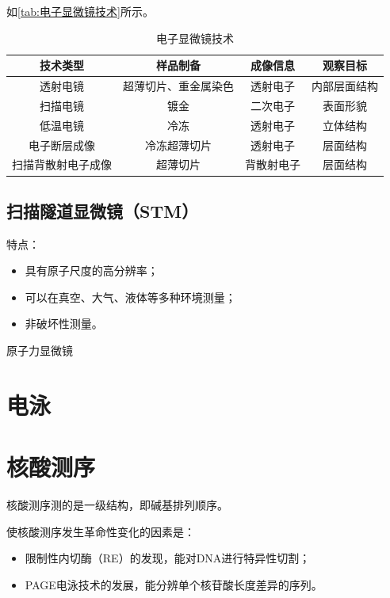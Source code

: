 如\autoref{tab:电子显微镜技术}所示。

\begin{table}[htbp]
	\centering
	\begin{tabularx}{\textwidth}{|c|c|C|C|}
		\hline
		\textbf{技术类型} & \textbf{样品制备} & \textbf{成像信息} & \textbf{观察目标} \\ \hline
		透射电镜 & 超薄切片、重金属染色 & 透射电子 & 内部层面结构 \\ \hline
		扫描电镜 & 镀金 & 二次电子 & 表面形貌 \\ \hline
		低温电镜 & 冷冻 & 透射电子 & 立体结构 \\ \hline
		电子断层成像 & 冷冻超薄切片 & 透射电子 & 层面结构 \\ \hline
		扫描背散射电子成像 & 超薄切片 & 背散射电子 & 层面结构 \\ \hline
	\end{tabularx}
	\caption{电子显微镜技术}
	\label{tab:电子显微镜技术}
\end{table}

\subsection{扫描隧道显微镜（STM）}

特点：
\begin{itemize}
	\item 具有原子尺度的高分辨率；
	\item 可以在真空、大气、液体等多种环境测量；
	\item 非破坏性测量。
\end{itemize}

原子力显微镜

\section{电泳}



\section{核酸测序}

核酸测序测的是一级结构，即碱基排列顺序。

使核酸测序发生革命性变化的因素是：
\begin{itemize}
	\item 限制性内切酶（RE）的发现，能对DNA进行特异性切割；
	\item PAGE电泳技术的发展，能分辨单个核苷酸长度差异的序列。
\end{itemize}

